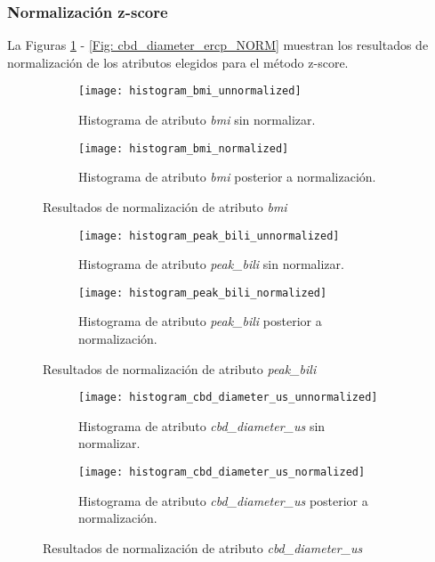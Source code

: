 \FloatBarrier
\subsubsection{Normalización z-score}
La Figuras \ref{Fig: bmi_NORM} - \ref{Fig: cbd_diameter_ercp_NORM} muestran los resultados de normalización de los atributos elegidos para el método z-score.

\begin{figure}[!htb]
	\centering
	\begin{subfigure}[b]{0.4\textwidth}
		\centering
		\texttt{[image: histogram\_bmi\_unnormalized]}
		\caption{Histograma de atributo \emph{bmi} sin normalizar.}
	\end{subfigure}
	\hfill
	\begin{subfigure}[b]{0.4\textwidth}
		\centering
		\texttt{[image: histogram\_bmi\_normalized]}
		\caption{Histograma de atributo \emph{bmi} posterior a normalización.}
	\end{subfigure}
	\caption{Resultados de normalización de atributo \emph{bmi}}
	\label{Fig: bmi_NORM}
\end{figure}


\begin{figure}[!htb]
	\centering
	\begin{subfigure}[b]{0.4\textwidth}
		\centering
		\texttt{[image: histogram\_peak\_bili\_unnormalized]}
		\caption{Histograma de atributo \emph{peak\_bili} sin normalizar.}
	\end{subfigure}
	\hfill
	\begin{subfigure}[b]{0.4\textwidth}
		\centering
		\texttt{[image: histogram\_peak\_bili\_normalized]}
		\caption{Histograma de atributo \emph{peak\_bili} posterior a normalización.}
	\end{subfigure}
	\caption{Resultados de normalización de atributo \emph{peak\_bili}}
	\label{Fig: peak_bili_NORM}
\end{figure}


\begin{figure}[!htb]
	\centering
	\begin{subfigure}[b]{0.4\textwidth}
		\centering
		\texttt{[image: histogram\_cbd\_diameter\_us\_unnormalized]}
		\caption{Histograma de atributo \emph{cbd\_diameter\_us} sin normalizar.}
	\end{subfigure}
	\hfill
	\begin{subfigure}[b]{0.4\textwidth}
		\centering
		\texttt{[image: histogram\_cbd\_diameter\_us\_normalized]}
		\caption{Histograma de atributo \emph{cbd\_diameter\_us} posterior a normalización.}
	\end{subfigure}
	\caption{Resultados de normalización de atributo \emph{cbd\_diameter\_us}}
	\label{Fig: cbd_diameter_us_NORM}
\end{figure}


